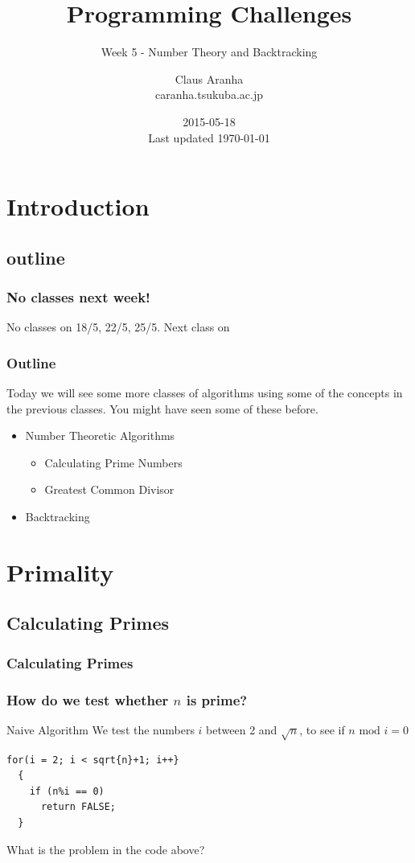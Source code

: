 \documentclass{beamer}
\title[]{Programming Challenges}
\subtitle[]{Week 5 - Number Theory and Backtracking}
\author[Claus Aranha]{Claus Aranha\\{\footnotesize caranha\@@cs.tsukuba.ac.jp}}
\institute{College of Information Sciences}
\date{2015-05-18\\{\tiny Last updated \today}}
\begin{document}
\section{Introduction}
\subsection{outline}

\begin{frame}
\maketitle
\end{frame}

\begin{frame}
  \frametitle{No classes next week!}

  No classes on \alert{18/5, 22/5, 25/5}.
  \vfill
  Next class on 
\end{frame}

\begin{frame}
\frametitle{Outline}
\begin{block}{}
  Today we will see some more classes of algorithms using some of the
  concepts in the previous classes. You might have seen some of these
  before.
\end{block}
\begin{itemize}
\item Number Theoretic Algorithms
  \begin{itemize}
  \item Calculating Prime Numbers
  \item Greatest Common Divisor
  \end{itemize}
\item Backtracking
\end{itemize}
\end{frame}

\section{Primality}
\subsection{Calculating Primes}
\begin{frame}
  \frametitle{Calculating Primes}
\end{frame}

\begin{frame}
  \frametitle{How do we test whether $n$ is prime?}
  \begin{block}{Naive Algorithm}
    We test the numbers $i$ between 2 and $\sqrt{n}$, to see if 
    $n \text{ mod } i=0$
  \end{block}
  \vfill
\begin{verbatim}
for(i = 2; i < sqrt{n}+1; i++}
  {
    if (n%i == 0)
      return FALSE;
  }
\end{verbatim}
  \vfill
  \begin{block}{}
    What is the problem in the code above?
  \end{block}
\end{frame}
\end{document}
